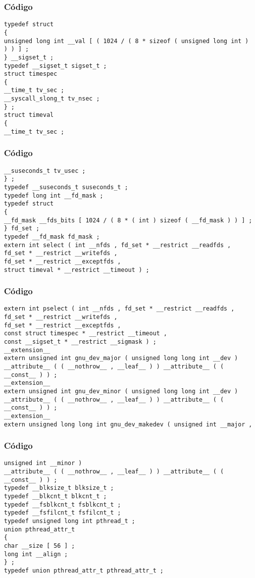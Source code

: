 \documentclass{beamer}
\begin{document}
\begin{frame}[fragile]
\frametitle{C\'odigo}
\begin{verbatim}
typedef struct 
{ 
unsigned long int __val [ ( 1024 / ( 8 * sizeof ( unsigned long int ) ) ) ] ; 
} __sigset_t ; 
typedef __sigset_t sigset_t ; 
struct timespec 
{ 
__time_t tv_sec ; 
__syscall_slong_t tv_nsec ; 
} ; 
struct timeval 
{ 
__time_t tv_sec ; 
\end{verbatim}
\end{frame}
\begin{frame}[fragile]
\frametitle{C\'odigo}
\begin{verbatim}
__suseconds_t tv_usec ; 
} ; 
typedef __suseconds_t suseconds_t ; 
typedef long int __fd_mask ; 
typedef struct 
{ 
__fd_mask __fds_bits [ 1024 / ( 8 * ( int ) sizeof ( __fd_mask ) ) ] ; 
} fd_set ; 
typedef __fd_mask fd_mask ; 
extern int select ( int __nfds , fd_set * __restrict __readfds , 
fd_set * __restrict __writefds , 
fd_set * __restrict __exceptfds , 
struct timeval * __restrict __timeout ) ; 
\end{verbatim}
\end{frame}
\begin{frame}[fragile]
\frametitle{C\'odigo}
\begin{verbatim}
extern int pselect ( int __nfds , fd_set * __restrict __readfds , 
fd_set * __restrict __writefds , 
fd_set * __restrict __exceptfds , 
const struct timespec * __restrict __timeout , 
const __sigset_t * __restrict __sigmask ) ; 
__extension__ 
extern unsigned int gnu_dev_major ( unsigned long long int __dev ) 
__attribute__ ( ( __nothrow__ , __leaf__ ) ) __attribute__ ( ( __const__ ) ) ; 
__extension__ 
extern unsigned int gnu_dev_minor ( unsigned long long int __dev ) 
__attribute__ ( ( __nothrow__ , __leaf__ ) ) __attribute__ ( ( __const__ ) ) ; 
__extension__ 
extern unsigned long long int gnu_dev_makedev ( unsigned int __major , 
\end{verbatim}
\end{frame}
\begin{frame}[fragile]
\frametitle{C\'odigo}
\begin{verbatim}
unsigned int __minor ) 
__attribute__ ( ( __nothrow__ , __leaf__ ) ) __attribute__ ( ( __const__ ) ) ; 
typedef __blksize_t blksize_t ; 
typedef __blkcnt_t blkcnt_t ; 
typedef __fsblkcnt_t fsblkcnt_t ; 
typedef __fsfilcnt_t fsfilcnt_t ; 
typedef unsigned long int pthread_t ; 
union pthread_attr_t 
{ 
char __size [ 56 ] ; 
long int __align ; 
} ; 
typedef union pthread_attr_t pthread_attr_t ; 
\end{verbatim}
\end{frame}
\end{document}
